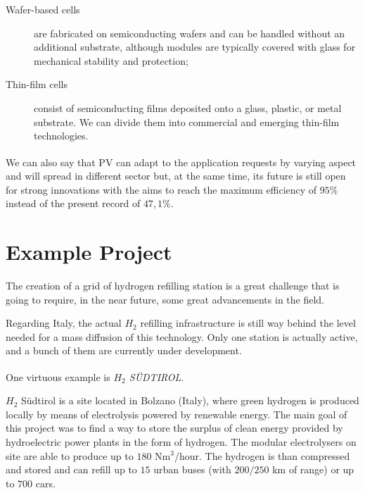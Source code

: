 \begin{description}
    \item[Wafer-based cells] are fabricated on semiconducting wafers and can be handled without an additional substrate, although modules are typically covered with glass for mechanical stability and protection;
    \item[Thin-film cells]  consist of semiconducting films deposited onto a glass, plastic, or metal substrate. We can divide them into commercial and emerging thin-film technologies.
\end{description}

We can also say\textsuperscript{\cite{PV2020}} that PV can adapt to the application requests by varying aspect and will spread in different sector but, at the same time, its future is still open for strong innovations with the aims to reach the maximum efficiency of $95\%$ instead of the present record of $47,1\%$.

\section{Example Project}

The creation of a grid of hydrogen refilling station is a great challenge that is going to require, in the near future, some great advancements in the field. 

Regarding Italy, the actual $H_2$ refilling infrastructure is still way behind the level needed for a mass diffusion of this technology. Only one station is actually active, and a bunch of them are currently under development.

One virtuous example is \textit{$H_2$ SÜDTIROL}\textsuperscript{\cite{centroidrogenobolzano}}.

$H_2$ Südtirol is a site located in Bolzano (Italy), where green hydrogen is produced locally by means of electrolysis powered by renewable energy. The main goal of this project was to find a way to store the surplus of clean energy provided by hydroelectric power plants in the form of hydrogen. The modular electrolysers on site are able to produce up to $180$ Nm$^3$/hour. The hydrogen is than compressed and stored and can refill up to $15$ urban buses (with $200/250$ km of range) or up to $700$ cars.